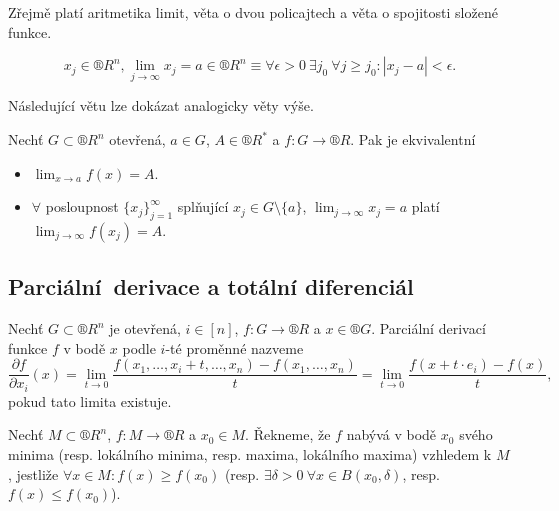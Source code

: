 \documentclass[12pt]{article}					%
\begin{document}
	\begin{poznamka}
		Zřejmě platí aritmetika limit, věta o dvou policajtech a věta o spojitosti složené funkce.
	\end{poznamka}

	\begin{definice}
		$$ x_j \in ®R^n, \lim_{j \rightarrow ∞} x_j = a \in ®R^n ≡ \forall \epsilon > 0\ \exists j_0\ \forall j ≥ j_0: |x_j - a|<\epsilon. $$
	\end{definice}

	\begin{poznamka}
		Následující větu lze dokázat analogicky věty výše.
	\end{poznamka}

	\begin{veta}[Heine]
		Nechť $G \subset ®R^n$ otevřená, $a \in G$, $A \in ®R^*$ a $f: G \rightarrow ®R$. Pak je ekvivalentní

		\begin{itemize}
			\item $\lim_{x \rightarrow a} f(x) = A$.
			\item $\forall$ posloupnost $\{x_j\}_{j=1}^∞$ splňující $x_j \in G \setminus \{a\}$, $\lim_{j \rightarrow ∞} x_j = a$ platí $\lim_{j \rightarrow ∞} f(x_j) = A$.
		\end{itemize}
	\end{veta}

	\subsection{Parciální derivace a totální diferenciál}
	\begin{definice}
		Nechť $G \subset ®R^n$ je otevřená, $i \in [n]$, $f: G \rightarrow ®R$ a $x \in ®G$. Parciální derivací funkce $f$ v bodě $x$ podle $i$-té proměnné nazveme
		$$ \frac{\partial f}{\partial x_i}(x) = \lim_{t \rightarrow 0} \frac{f(x_1, …, x_i + t, …, x_n) - f(x_1, …, x_n)}{t} = \lim_{t \rightarrow 0} \frac{f(x+t·e_i) - f(x)}{t}, $$
		pokud tato limita existuje.
	\end{definice}

	\begin{definice}[Extrémy]
		Nechť $M \subset ®R^n$, $f: M \rightarrow ®R$ a $x_0 \in M$. Řekneme, že $f$ nabývá v bodě $x_0$ svého minima (resp. lokálního minima, resp. maxima, lokálního maxima) vzhledem k $M$, jestliže $\forall x \in M: f(x) ≥ f(x_0)$ (resp. $\exists \delta > 0\ \forall x \in B(x_0, \delta)$, resp. $f(x) ≤ f(x_0)$).
	\end{definice}
\end{document}
